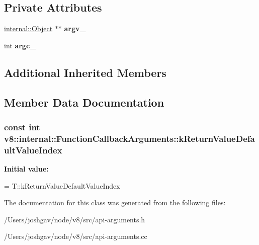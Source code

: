 \subsection*{Private Attributes}
\begin{DoxyCompactItemize}
\item 
\hyperlink{classv8_1_1internal_1_1_object}{internal\+::\+Object} $\ast$$\ast$ {\bfseries argv\+\_\+}\hypertarget{classv8_1_1internal_1_1_function_callback_arguments_ac3518558373e32e55cb28d01712770d7}{}\label{classv8_1_1internal_1_1_function_callback_arguments_ac3518558373e32e55cb28d01712770d7}

\item 
int {\bfseries argc\+\_\+}\hypertarget{classv8_1_1internal_1_1_function_callback_arguments_aa1b92554777cab700d048672b4a46542}{}\label{classv8_1_1internal_1_1_function_callback_arguments_aa1b92554777cab700d048672b4a46542}

\end{DoxyCompactItemize}
\subsection*{Additional Inherited Members}


\subsection{Member Data Documentation}
\subsubsection[{\texorpdfstring{k\+Return\+Value\+Default\+Value\+Index}{kReturnValueDefaultValueIndex}}]{\setlength{\rightskip}{0pt plus 5cm}const int v8\+::internal\+::\+Function\+Callback\+Arguments\+::k\+Return\+Value\+Default\+Value\+Index\hspace{0.3cm}{\ttfamily [static]}}\hypertarget{classv8_1_1internal_1_1_function_callback_arguments_acea5b4f12674359f9dcfd43ab6be7795}{}\label{classv8_1_1internal_1_1_function_callback_arguments_acea5b4f12674359f9dcfd43ab6be7795}
{\bfseries Initial value\+:}
\begin{DoxyCode}
=
      T::kReturnValueDefaultValueIndex
\end{DoxyCode}


The documentation for this class was generated from the following files\+:\begin{DoxyCompactItemize}
\item 
/\+Users/joshgav/node/v8/src/api-\/arguments.\+h\item 
/\+Users/joshgav/node/v8/src/api-\/arguments.\+cc\end{DoxyCompactItemize}
